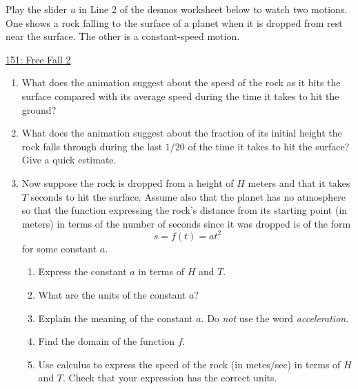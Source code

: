 \documentclass{ximera}
\begin{document}
\begin{question} \label{Qd90t90ette}
Play the slider $u$ in Line 2 of the desmos worksheet below to watch two motions. One shows a rock falling to the surface of a planet when it is dropped from rest near the surface. The other is a constant-speed motion.

\begin{onlineOnly}
    \begin{center}
\end{center}
\end{onlineOnly}

\href{https://www.desmos.com/calculator/dmlrxahkld}{151: Free Fall 2}

\begin{enumerate}

\item What does the animation suggest about the speed of the rock as it hits the surface compared with its average speed during the time it takes to hit the ground?

\item What does the animation suggest about the fraction of its initial height the rock falls through during the last $1/20$ of the time it takes to hit the surface? Give a quick estimate.

\item Now suppose the rock is dropped from a height of $H$ meters and that it takes $T$ seconds to hit the surface. Assume also that the planet has no atmosphere so that the function expressing the rock's distance from its starting point (in meters) in terms of the number of seconds since it was dropped is of the form
\[
      s = f(t) = at^2
\]  
for some constant $a$.

\begin{enumerate}

\item Express the constant $a$ in terms of $H$ and $T$. 

\item What are the units of the constant $a$?

\item Explain the meaning of the constant $a$. Do \emph{not} use the word \emph{acceleration}.

\item Find the domain of the function $f$.

\item Use calculus to express the speed of the rock (in metes/sec) in terms of $H$ and $T$. Check that your expression has the correct units.


\end{enumerate}
\end{enumerate}
\end{question}
\end{document}
